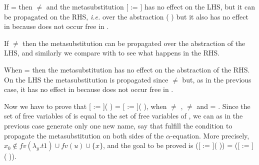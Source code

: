 \begin{coqdoccode}
\end{coqdoccode}
If  =  then  \ensuremath{\not=}  and the metasubstitution [ := ] has no effect on the LHS, but it can be propagated on the RHS, {\it i.e.} over the abstraction (  ) but it also has no effect in  because  does not occur free in . 
\begin{coqdoccode}
\end{coqdoccode}
If  \ensuremath{\not=}  then the metasubstitution can be propagated over the abstraction of the LHS, and similarly we compare  with  to see what happens in the RHS. 
\begin{coqdoccode}
\end{coqdoccode}
When  =  then the metasubstitution has no effect on the abstraction of the RHS. On the LHS the metasubstitution is propagated since  \ensuremath{\not=}  but, as in the previous case, it has no effect in  because  does not occur free in .
\begin{coqdoccode}
\end{coqdoccode}
Now we have to prove that [ := ](  ) = [ := ](  ), when  \ensuremath{\not=} ,  \ensuremath{\not=}  and    =   . Since the set of free variables of    is equal to the set of free variables of   , we can as in the previous case generate only one new name, say  that fulfill the condition to propagate the metasubstitution on both sides of the $\alpha$-equation. More precisely, $x_0 \notin fv(\lambda_y.t1) \cup fv(u) \cup \{x\}$, and the goal to be proved is   ([ := ](   )) =   ([ := ](   )).
\begin{coqdoccode}
\end{coqdoccode}

